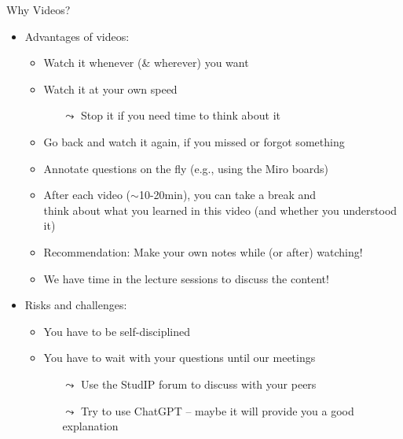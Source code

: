 \documentclass[aspectratio=169]{../latex_main/tntbeamer}  %
\begin{document}
\begin{frame}[c]{Why Videos?}


\begin{itemize}
  \item Advantages of videos:
  \begin{itemize}
      \item Watch it whenever (\& wherever) you want
      \item Watch it at your own speed
      \begin{itemize}
          \item[$\leadsto$] Stop it if you need time to think about it
      \end{itemize}
      \item Go back and watch it again, if you missed or forgot something
      \item Annotate questions on the fly (e.g., using the Miro boards)
      \item After each video ($\sim$10-20min), you can take a break and\\ think about what you learned in this video (and whether you understood it)
      \item \alert{Recommendation:} Make your own notes while (or after) watching!
      \pause
      \item \alert{We have time in the lecture sessions to discuss the content!}
  \end{itemize}
  \medskip
  \pause
  \item Risks and challenges:
  \begin{itemize}
      \item You have to be self-disciplined 
      \item You have to wait with your questions until our meetings
      \begin{itemize}
          \item[$\leadsto$] Use the StudIP forum to discuss with your peers
          \item[$\leadsto$] Try to use ChatGPT -- \alert{maybe} it will provide you a good explanation
      \end{itemize}
  \end{itemize}
\end{itemize}

\end{frame}
\end{document}
